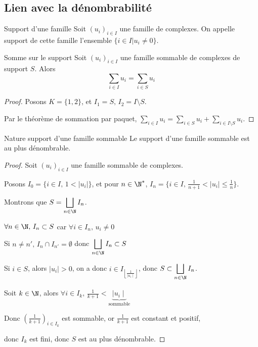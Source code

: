 \subsection{Lien avec la dénombrabilité }

\begin{definition}{Support d'une famille}{}
    Soit $(u_i)_{i \in I}$ une famille de complexes. On appelle support de cette 
    famille l'ensemble $\{ i \in I | u_i \neq 0 \}$.
\end{definition}

\begin{proposition}{Somme sur le support}{}
    Soit $(u_i)_{i \in I}$ une famille sommable de complexes de support $S$. Alors 
    $$\sum_{i \in I} u_i = \sum_{i \in S} u_i$$

\end{proposition}


\begin{proof}
    Posons $K = \{1, 2\}$, et $I_1 = S, \, I_2 = I \setminus S$.

    Par le théorème de sommation par paquet, $\displaystyle \sum_{i \in I} u_i = \sum_{i \in S} u_i + \sum_{i \in I \setminus S} u_i$.
\end{proof}

\begin{theoreme}{Nature support d'une famille sommable}{}
    Le support d'une famille sommable est au plus dénombrable. 
\end{theoreme}

\begin{proof}
    Soit $(u_i)_{i \in I}$ une famille sommable de complexes. 

    Posons $I_0 = \{ i \in I, \, 1 < \mid u_i \mid \}$, et pour $n \in \N^*$,
    $I_n = \{ i \in I, \, \frac 1 {n + 1} < \mid u_i \mid \leqslant \frac 1 n \}$.

    Montrons que $\displaystyle S = \bigsqcup_{n \in \N} I_n$. 

    $\forall n \in \N, \, I_n \subset S$ car $\forall i \in I_n, \, u_i \neq 0$

    Si $n \neq n', \, I_n \cap I_{n'} = \emptyset$ donc $\displaystyle \bigsqcup_{n \in \N} I_n \subset S$

    Si $i \in S$, alors $\mid u_i \mid > 0$, on a donc $\displaystyle i \in I_{\left\lfloor \frac 1 {\mid u_i \mid} \right\rfloor}$, 
    donc $S \subset \displaystyle \bigsqcup_{n \in \N} I_n$.

    Soit $k \in \N$, alors $\forall i \in I_k, \, \frac 1 {k + 1} < \underbrace{\mid u_i \mid}_{\text{sommable}}$

    Donc $\left( \frac 1 {k + 1} \right)_{i \in I_k}$ est sommable, or $\frac 1 {k + 1}$ est constant et positif, 

    donc $I_k$ est fini, donc $S$ est au plus dénombrable.
\end{proof}

